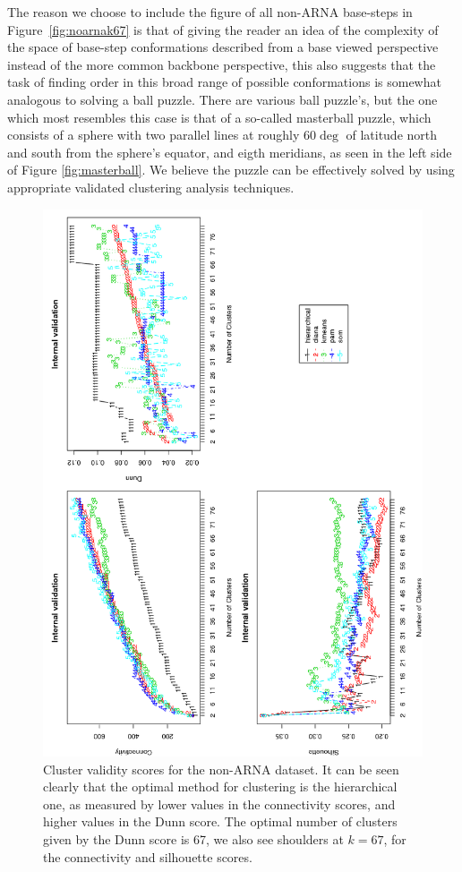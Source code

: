The reason we choose to  include the figure of all non-ARNA base-steps
in Figure~\ref{fig:noarnak67} is that of  giving the reader an idea of
the complexity of the  space of base-step conformations described from
a  base  viewed  perspective  instead  of  the  more  common  backbone
perspective, this also suggests that the task of finding order in this
broad range of possible conformations is somewhat analogous to solving
a ball puzzle. There are various ball puzzle's, but the one which most
resembles this  case is that  of a so-called masterball  puzzle, which
consists of  a sphere with two  parallel lines at  roughly 60$\deg$ of
latitude  north  and  south  from  the  sphere's  equator,  and  eigth
meridians,    as    seen    in     the    left    side    of    Figure
\ref{fig:masterball}. We believe the puzzle can be effectively solved
by using appropriate validated clustering analysis techniques.


\begin{figure}
 \centering
\includegraphics[angle=0, scale=0.8]{Chapter2/noarna_val.png}
\caption{Cluster validity  scores for the non-ARNA dataset.  It can be
  seen  clearly  that  the   optimal  method  for  clustering  is  the
  hierarchical one,  as measured by  lower values in  the connectivity
  scores, and higher  values in the Dunn score.  The optimal number of
  clusters given  by the Dunn  score is 67,  we also see  shoulders at
  $k=67$, for the connectivity and silhouette scores.}
 \label{fig:noarna}
\end{figure}

